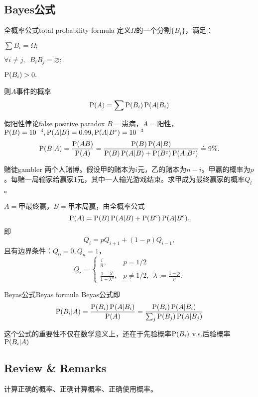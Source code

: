 \subsection{Bayes公式}
\begin{theorem}{全概率公式}{total probability formula}
	定义$\Omega$的一个分割$\{B_i\}$，满足：
	\begin{compactenum}
		\item $\sum B_i=\Omega;$
		\item $\forall i\neq j,\enspace B_iB_j=\varnothing;$
		\item $\P(B_i)>0.$
	\end{compactenum}
	则$A$事件的概率
	\begin{align}
		\P(A)=\sum\P(B_i)\P(A|B_i)
	\end{align}
\end{theorem}
\begin{example}{假阳性悖论}{false positive paradox}
	$B=$患病，$A=$阳性，$\P(B)=10^{-4},\P(A|B)=0.99,\P(A|B\c)=10^{-3}$
	\[
		\P(B|A)=\frac{\P(AB)}{\P(A)}=\frac{\P(B)\P(A|B)}{\P(B)\P(A|B)+\P(B\c)\P(A|B\c)}\doteq 9\%.
	\]
\end{example}
\begin{example}{赌徒}{gambler}
	两个人赌博。假设甲的赌本为$i$元，乙的赌本为$n-i$。甲赢的概率为$p$。每赌一局输家给赢家1元，其中一人输光游戏结束。求甲成为最终赢家的概率$Q_i$。

	$A=$甲最终赢，$B=$甲本局赢，由全概率公式
	\[
		\P(A)=\P(B)\P(A|B)+\P(B\c)\P(A|B\c).
	\]
	即
	\[
		Q_i=pQ_{i+1}+(1-p)Q_{i-1},%
	\]
	且有边界条件：$Q_0=0,Q_n=1$，
	\[
		Q_i=\begin{cases}
			\frac in,&p=1/2\\[2ex]
			\frac{1-\lambda^i}{1-\lambda^n},&p\neq 1/2,\enspace\lambda:=\frac{1-p}p.
		\end{cases}
	\]
\end{example}
\begin{theorem}{Beyas公式}{Beyas formula}
	Beyas公式即
	\begin{align}
		\P(B_i|A)=\frac{\P(B_i)\P(A|B_i)}{\P(A)}=\frac{\P(B_i)\P(A|B_i)}{\sum_j\P(B_j)\P(A|B_j)}
	\end{align}
\end{theorem}
这个公式的重要性不仅在数学意义上，还在于先验概率$\P(B_i)$ v.s.后验概率$\P(B_i|A)$

\subsection*{Review \& Remarks}
计算正确的概率、正确计算概率、正确使用概率。
\clearpage
